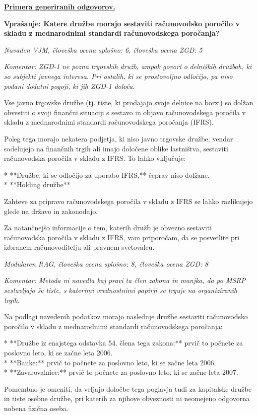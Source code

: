 \documentclass[a4paper,12pt,openright]{book}
\begin{document}
\underline{\textbf{Primera generiranih odgovorov.}}

\textbf{Vprašanje: Katere družbe morajo sestaviti računovodsko poročilo v skladu z mednarodnimi standardi računovodskega poročanja?}

\textit{Navaden VJM, človeška ocena splošno: 6, človeška ocena ZGD: 5}

\textit{Komentar: ZGD-1 ne pozna trgovskih družb, ampak govori o delniških družbah, ki so subjekti javnega interesa. Pri ostalih, ki se prostovoljno odločijo, pa niso podani dodatni pogoji, ki jih ZGD-1 določa.}

\begin{mdframed}[linewidth=1pt]
    \raggedright
    \ttfamily
    Vse javno trgovske družbe (tj. tiste, ki prodajajo svoje delnice na borzi) so dolžan obvestiti o svoji finančni situaciji s sestavo in objavo računovodskega poročila v skladu z mednarodnimi standardi računovodskega poročanja (IFRS).

Poleg tega morajo nekatera podjetja, ki niso javno trgovske družbe, vendar sodelujejo na finančnih trgih ali imajo določene oblike lastništva, sestaviti računovodska poročila v skladu z IFRS. To lahko vključuje:

* **Družbe, ki se odločijo za uporabo IFRS,** čeprav niso dolžane. \\
* **Holding družbe**

Zahteve za pripravo računovodskega poročila v skladu z IFRS se lahko razlikujejo glede na državo in zakonodajo.


Za natančnejšo informacije o tem, katerih družb je obvezno sestaviti računovodska poročila v skladu z IFRS, vam priporočam, da se posvetlite pri izbranem računovoditelju ali pravnem svetovalcu.

\end{mdframed}

\textit{Modularen RAG, človeška ocena splošno: 8, človeška ocena ZGD: 8}

\textit{Komentar: Metoda ni navedla kaj pravi ta člen zakona in manjka, da po MSRP sestavljajo še tiste, s katerimi vrednostnimi papirji se trguje na organiziranih trgih.}

\begin{mdframed}[linewidth=1pt]
    \raggedright
    \ttfamily
    Na podlagi navedenih podatkov morajo naslednje družbe sestaviti računovodsko poročilo v skladu z mednarodnimi standardi računovodskega poročanja:

* **Družbe iz enajstega odstavka 54. člena tega zakona:**  prvič to počnete za poslovno leto, ki se začne leta 2006. \\
* **Banke:** prvič to počnete za poslovno leto, ki se začne leta 2006. \\
* **Zavarovalnice:** prvič to počnete za poslovno leto, ki se začne leta 2007.

Pomembno je omeniti, da veljajo določbe tega poglavja tudi za kapitalske družbe in tiste osebne družbe, pri katerih za njihove obveznosti ni neomejeno odgovorna nobena fizična oseba.

\end{mdframed}
\end{document}
